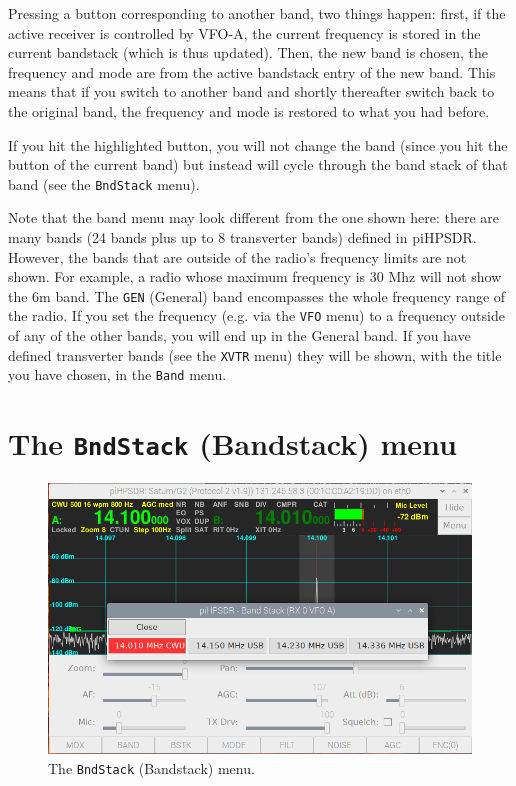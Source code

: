 \documentclass[12pt]{book}
\def\rett#1{\texttt{\color{red}#1}}
\def\bltt#1{\texttt{\color{blue}#1}}
\begin{document}
Pressing a button corresponding to another band, two things happen: first, if the
active receiver is controlled by VFO-A, the current frequency is stored in the current
bandstack (which is thus updated). Then, the new band is chosen, the frequency and mode
are from the active bandstack entry of the new band. This means that if you switch
to another band and shortly thereafter switch back to the original band, the
frequency and mode is restored to what you had before.

If you hit the highlighted button, you will not change the band (since you hit the
button of the current band) but instead will cycle through the band stack of that band
(see the \bltt{BndStack} menu).


Note that the band menu may look different from the one shown here: there are many bands
(24 bands plus up to 8 transverter bands) defined in piHPSDR. However, the bands that
are outside of the radio's frequency limits are not shown. For example, a radio
whose maximum frequency is 30 Mhz will not show the 6m band. The \rett{GEN} (General)
band encompasses the whole frequency range of the radio. If you set the frequency
(e.g. via the \bltt{VFO} menu) to a frequency outside of any of the other bands, you
will end up in the General band. If you have defined transverter bands (see the
\bltt{XVTR} menu) they will be shown, with the title you have chosen, in the
\bltt{Band} menu.

\section{The  \texttt{BndStack} (Bandstack) menu}

\begin{figure}[ht!]
\center
\includegraphics[width=12cm]{BandstackMenu.png}
\caption{The \bltt{BndStack} (Bandstack) menu.}
\label{fig:BandstackMenu}
\end{figure}
\end{document}
